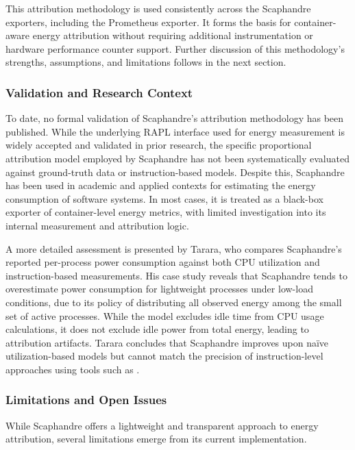 This attribution methodology is used consistently across the Scaphandre exporters, including the Prometheus exporter. It forms the basis for container-aware energy attribution without requiring additional instrumentation or hardware performance counter support. Further discussion of this methodology’s strengths, assumptions, and limitations follows in the next section.

\subsubsection{Validation and Research Context}
\label{sec:scaphandre-validation}

To date, no formal validation of Scaphandre’s attribution methodology has been published. While the underlying RAPL interface used for energy measurement is widely accepted and validated in prior research, the specific proportional attribution model employed by Scaphandre has not been systematically evaluated against ground-truth data or instruction-based models. Despite this, Scaphandre has been used in academic and applied contexts for estimating the energy consumption of software systems. In most cases, it is treated as a black-box exporter of container-level energy metrics, with limited investigation into its internal measurement and attribution logic.

A more detailed assessment is presented by Tarara\parencite{Tarara2023CpuUtilization}, who compares Scaphandre’s reported per-process power consumption against both CPU utilization and instruction-based measurements. His case study reveals that Scaphandre tends to overestimate power consumption for lightweight processes under low-load conditions, due to its policy of distributing all observed energy among the small set of active processes. While the model excludes idle time from CPU usage calculations, it does not exclude idle power from total energy, leading to attribution artifacts. Tarara concludes that Scaphandre improves upon naïve utilization-based models but cannot match the precision of instruction-level approaches using tools such as .

\subsubsection{Limitations and Open Issues}
\label{sec:scaphandre-limitations}

While Scaphandre offers a lightweight and transparent approach to energy attribution, several limitations emerge from its current implementation.

